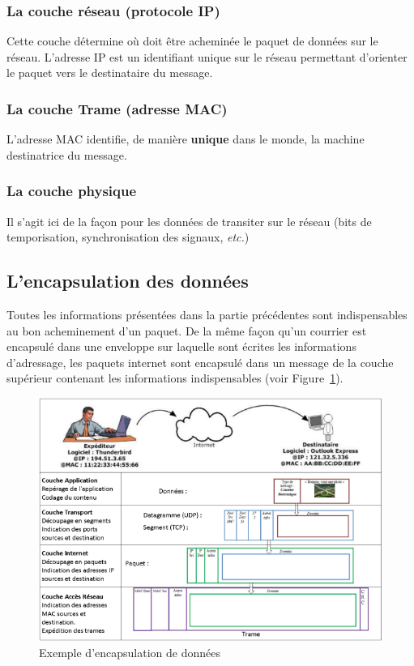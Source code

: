 \documentclass[11pt]{article}
\begin{document}

\subsubsection{La couche réseau (protocole IP)}
Cette couche détermine {où doit être acheminée le paquet de données sur le réseau}. L'adresse IP est un identifiant unique sur le réseau permettant d'orienter le paquet vers le destinataire du message.


\subsubsection{La couche Trame (adresse MAC)}
L'adresse MAC identifie, de manière \textbf{unique} dans le monde, la machine destinatrice du message.


\subsubsection{La couche physique}
Il s'agit ici de la façon pour les données de transiter sur le réseau (bits de temporisation, synchronisation des signaux, \textit{etc.})


\subsection{L'encapsulation des données}
Toutes les informations présentées dans la partie précédentes sont indispensables au bon acheminement d'un paquet. De la même façon qu'un courrier est encapsulé dans une enveloppe sur laquelle sont écrites les informations d'adressage, les paquets internet sont encapsulé dans un message de la couche supérieur contenant les informations indispensables (voir Figure~\ref{fig:res_encapsulation}).

\begin{figure}[h!t]
  \centering
  \includegraphics[width=.7\textwidth]{Src/Images/reseau_encapsulation}
  \caption{Exemple d'encapsulation de données}
  \label{fig:res_encapsulation}
\end{figure}
\end{document}

